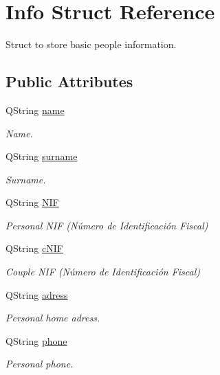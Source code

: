 \hypertarget{struct_info}{\section{Info Struct Reference}
\label{struct_info}
}


Struct to store basic people information.  


\subsection*{Public Attributes}
\begin{DoxyCompactItemize}
\item 
Q\+String \hyperlink{struct_info_abedda733b9fd73013c473e3873dff857}{name}
\begin{DoxyCompactList}\small\item\em Name. \end{DoxyCompactList}\item 
Q\+String \hyperlink{struct_info_a7c380abfc7270f0c19ea6bc4db4c89a9}{surname}
\begin{DoxyCompactList}\small\item\em Surname. \end{DoxyCompactList}\item 
Q\+String \hyperlink{struct_info_a81aa1db72f631011ba7426099479f35c}{N\+I\+F}
\begin{DoxyCompactList}\small\item\em Personal N\+I\+F (Número de Identificación Fiscal) \end{DoxyCompactList}\item 
Q\+String \hyperlink{struct_info_a49fbb11aff87b66c956560ec2bc31df4}{c\+N\+I\+F}
\begin{DoxyCompactList}\small\item\em Couple N\+I\+F (Número de Identificación Fiscal) \end{DoxyCompactList}\item 
Q\+String \hyperlink{struct_info_ad06b1d7b878c03e41bf30efb34dfbdf6}{adress}
\begin{DoxyCompactList}\small\item\em Personal home adress. \end{DoxyCompactList}\item 
Q\+String \hyperlink{struct_info_a112f47a5e74f513da22e17d78dd9979a}{phone}
\begin{DoxyCompactList}\small\item\em Personal phone. \end{DoxyCompactList}\item 

\end{DoxyCompactItemize}
